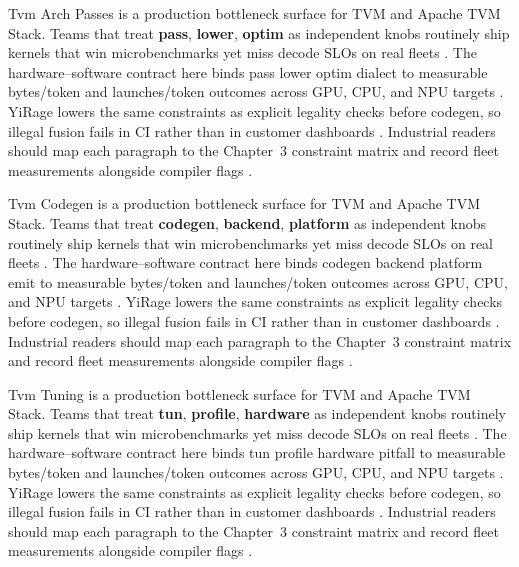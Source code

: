 Tvm Arch Passes is a production bottleneck surface for TVM and Apache TVM Stack. Teams that treat \textbf{pass}, \textbf{lower}, \textbf{optim} as independent knobs routinely ship kernels that win microbenchmarks yet miss decode SLOs on real fleets \citep{nvidia2024cudagraphs,taxbreak2026}. The hardware--software contract here binds pass lower optim dialect to measurable bytes/token and launches/token outcomes across GPU, CPU, and NPU targets \citep{liu2024deepseekv3,memoryfloor2026}. YiRage lowers the same constraints as explicit legality checks before codegen, so illegal fusion fails in CI rather than in customer dashboards \citep{patel2025llminference,nvidia2022hopper}. Industrial readers should map each paragraph to the Chapter~3 constraint matrix and record fleet measurements alongside compiler flags \citep{taxbreak2026,semianalysis2024tma}.

Tvm Codegen is a production bottleneck surface for TVM and Apache TVM Stack. Teams that treat \textbf{codegen}, \textbf{backend}, \textbf{platform} as independent knobs routinely ship kernels that win microbenchmarks yet miss decode SLOs on real fleets \citep{liu2024deepseekv3,memoryfloor2026}. The hardware--software contract here binds codegen backend platform emit to measurable bytes/token and launches/token outcomes across GPU, CPU, and NPU targets \citep{patel2025llminference,nvidia2022hopper}. YiRage lowers the same constraints as explicit legality checks before codegen, so illegal fusion fails in CI rather than in customer dashboards \citep{taxbreak2026,semianalysis2024tma}. Industrial readers should map each paragraph to the Chapter~3 constraint matrix and record fleet measurements alongside compiler flags \citep{memoryfloor2026,amd2024xdna}.

Tvm Tuning is a production bottleneck surface for TVM and Apache TVM Stack. Teams that treat \textbf{tun}, \textbf{profile}, \textbf{hardware} as independent knobs routinely ship kernels that win microbenchmarks yet miss decode SLOs on real fleets \citep{patel2025llminference,nvidia2022hopper}. The hardware--software contract here binds tun profile hardware pitfall to measurable bytes/token and launches/token outcomes across GPU, CPU, and NPU targets \citep{taxbreak2026,semianalysis2024tma}. YiRage lowers the same constraints as explicit legality checks before codegen, so illegal fusion fails in CI rather than in customer dashboards \citep{memoryfloor2026,amd2024xdna}. Industrial readers should map each paragraph to the Chapter~3 constraint matrix and record fleet measurements alongside compiler flags \citep{nvidia2022hopper,amd2024aie}.

